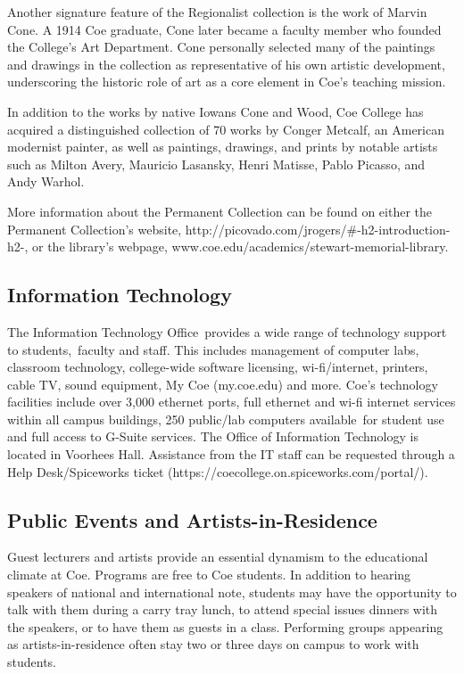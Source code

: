\documentclass[
  letterpaper,
]{scrbook}
\begin{document}
Another signature feature of the Regionalist collection is the work of
Marvin Cone. A 1914 Coe graduate, Cone later became a faculty member who
founded the College's Art Department. Cone personally selected many of
the paintings and drawings in the collection as representative of his
own artistic development, underscoring the historic role of art as a
core element in Coe's teaching mission.

In addition to the works by native Iowans Cone and Wood, Coe College has
acquired a distinguished collection of 70 works by Conger Metcalf, an
American modernist painter, as well as paintings, drawings, and prints
by notable artists such as Milton Avery, Mauricio Lasansky, Henri
Matisse, Pablo Picasso, and Andy Warhol.

More information about the Permanent Collection can be found on either
the Permanent Collection's website,
http://picovado.com/jrogers/\#-h2-introduction-h2-, or the library's
webpage, www.coe.edu/academics/stewart-memorial-library.

\subsection{Information Technology}\label{information-technology}

The Information Technology Office~provides a wide range of technology
support to students,~faculty and staff. This includes management of
computer labs, classroom technology, college-wide software licensing,
wi-fi/internet, printers, cable TV, sound equipment, My Coe (my.coe.edu)
and more. Coe's technology facilities include over 3,000 ethernet ports,
full ethernet and wi-fi internet services within all campus buildings,
250 public/lab computers available~for student use and full access to
G-Suite services. The Office of Information Technology is located in
Voorhees Hall. Assistance from the IT staff can be requested through a
Help Desk/Spiceworks ticket
(https://coecollege.on.spiceworks.com/portal/).~

\subsection{Public Events and
Artists-in-Residence}\label{public-events-and-artists-in-residence}

Guest lecturers and artists provide an essential dynamism to the
educational climate at Coe. Programs are free to Coe students. In
addition to hearing speakers of national and international note,
students may have the opportunity to talk with them during a carry tray
lunch, to attend special issues dinners with the speakers, or to have
them as guests in a class. Performing groups appearing as
artists-in-residence often stay two or three days on campus to work with
students.
\end{document}
